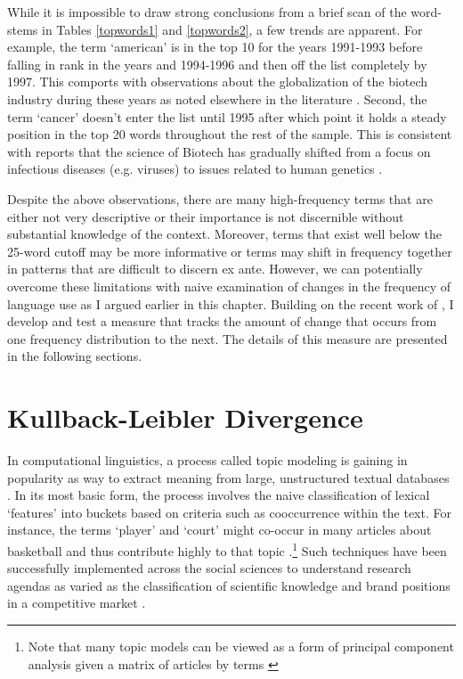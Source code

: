 While it is impossible to draw strong conclusions from a brief scan of the word-stems in Tables \ref{topwords1} and \ref{topwords2}, a few trends are apparent. For example, the  term `american' is in the top 10 for the years 1991-1993 before falling in rank in the years and 1994-1996 and then off the list completely by 1997. This comports with observations about the globalization of the biotech industry during these years as noted elsewhere in the literature \citep[e.g.][]{powell1999}. Second, the term `cancer' doesn't enter the list until 1995 after which point it holds a steady position in the top 20 words throughout the rest of the sample. This is consistent with reports that the science of Biotech has gradually shifted from a focus on infectious diseases (e.g. viruses) to issues related to human genetics \citep{wolff2001}.

Despite the above observations, there are many high-frequency terms that are either not very descriptive or their importance is not discernible without substantial knowledge of the context. Moreover, terms that exist well below the 25-word cutoff may be more informative or terms may shift in frequency together in patterns that are difficult to discern ex ante. However, we can potentially overcome these limitations with naive examination of changes in the frequency of language use as I argued earlier in this chapter. Building on the recent work of \citet{klingenstein2014}, I develop and test a measure that tracks the amount of change that occurs from one frequency distribution to the next. The details of this measure are presented in the following sections.

\section{Kullback-Leibler Divergence\label{kld}}

In computational linguistics, a process called topic modeling is gaining in popularity as way to extract meaning from large, unstructured textual databases \citep{blei2012}. In its most basic form, the process involves the naive classification of lexical `features' into buckets based on criteria such as cooccurrence within the text. For instance, the terms `player' and `court' might co-occur in many articles about basketball and thus contribute highly to that topic \citep{blei2009}.\footnote{Note that many topic models can be viewed as a form of principal component analysis given a matrix of articles by terms \citep{blei2012}} Such techniques have been successfully implemented across the social sciences to understand research agendas as varied as the classification of scientific knowledge \citep{blei2007} and brand positions in a competitive market \citep{tirunillai2014}.

